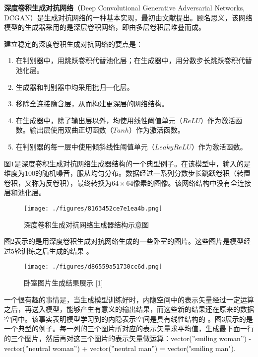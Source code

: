 

\textbf{深度卷积生成对抗网络}（Deep Convolutional Generative Adversarial Networks, DCGAN）是生成对抗网络的一种基本实现，最初由文献\cite{DCGAN}提出。顾名思义，该网络模型的生成器采用的是深层卷积网络，即由多层卷积层堆叠而成。

建立稳定的深度卷积生成对抗网络的要点是\cite{DCGAN}：
\begin{enumerate}
\item 在判别器中，用跳跃卷积代替池化层；在生成器中，用分数步长跳跃卷积代替池化层。
\item 生成器和判别器中均采用批归一化层。
\item 移除全连接隐含层，从而构建更深层的网络结构。
\item 在生成器中，除了输出层以外，均使用线性阈值单元（$ReLU$）作为激活函数。输出层使用双曲正切函数（$Tanh$）作为激活函数。
\item 在判别器的每一层中使用倾斜线性阈值单元（$Leaky ReLU$）作为激活函数。
\end{enumerate}

图$1$是深度卷积生成对抗网络生成器结构的一个典型例子。在该模型中，输入的是维度为$100$的随机噪音，服从均匀分布。数据经过一系列分数步长跳跃卷积（转置卷积，又称为反卷积），最终转换为$64 \times64$像素的图像。该网络结构中没有全连接层和池化层。
\begin{figure}[ht]
\centering
\texttt{[image: ./figures/8163452ce7e1ea4b.png]}
\caption{深度卷积生成对抗网络生成器结构示意图 \cite{DCGAN}} \label{fig_DCGAN_1}
\end{figure}

图$2$表示的是用深度卷积生成对抗网络生成的一些卧室的图片。这些图片是模型经过$5$轮训练之后生成的结果 \cite{DCGAN}。
\begin{figure}[ht]
\centering
\texttt{[image: ./figures/d86559a51730cc6d.png]}
\caption{卧室图片生成结果展示 [1]} \label{fig_DCGAN_2}
\end{figure}

一个很有趣的事情是，当生成模型训练好时，内隐空间中的表示矢量经过一定运算之后，再送入模型，能够产生有意义的输出结果，而这些新的结果还在原来的数据空间中。该事实表明模型学习到的内隐表示空间是具有线性结构的 \cite{DCGAN}。图$3$展示的是一个典型的例子。每一列的三个图片所对应的表示矢量求平均值，生成最下面一行的三个图片，然后再对这三个图片的表示矢量做运算：vector(”smiling woman”) - vector(”neutral woman”) + vector(”neutral man”) = vector("smiling man").

